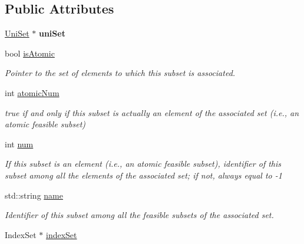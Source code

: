 \subsection*{Public Attributes}
\begin{DoxyCompactItemize}
\item 
\hypertarget{classUniSubset_a8e80f41fd95fe897ff04c813395c85d4}{\hyperlink{classUniSet}{Uni\-Set} $\ast$ {\bfseries uni\-Set}}\label{classUniSubset_a8e80f41fd95fe897ff04c813395c85d4}

\item 
\hypertarget{classUniSubset_a33f088ffb21e664508cfbfb75341513a}{bool \hyperlink{classUniSubset_a33f088ffb21e664508cfbfb75341513a}{is\-Atomic}}\label{classUniSubset_a33f088ffb21e664508cfbfb75341513a}

\begin{DoxyCompactList}\small\item\em Pointer to the set of elements to which this subset is associated. \end{DoxyCompactList}\item 
\hypertarget{classUniSubset_af111f69a265de0069e5705ce2c222f45}{int \hyperlink{classUniSubset_af111f69a265de0069e5705ce2c222f45}{atomic\-Num}}\label{classUniSubset_af111f69a265de0069e5705ce2c222f45}

\begin{DoxyCompactList}\small\item\em {\ttfamily true} if and only if this subset is actually an element of the associated set (i.\-e., an atomic feasible subset) \end{DoxyCompactList}\item 
\hypertarget{classUniSubset_a0b5a528a9edcc11061baff6ca4ce2657}{int \hyperlink{classUniSubset_a0b5a528a9edcc11061baff6ca4ce2657}{num}}\label{classUniSubset_a0b5a528a9edcc11061baff6ca4ce2657}

\begin{DoxyCompactList}\small\item\em If this subset is an element (i.\-e., an atomic feasible subset), identifier of this subset among all the elements of the associated set; if not, always equal to {\ttfamily -\/1} \end{DoxyCompactList}\item 
\hypertarget{classUniSubset_accf967a0475f78b1998fa3aaa2a6ae8e}{std\-::string \hyperlink{classUniSubset_accf967a0475f78b1998fa3aaa2a6ae8e}{name}}\label{classUniSubset_accf967a0475f78b1998fa3aaa2a6ae8e}

\begin{DoxyCompactList}\small\item\em Identifier of this subset among all the feasible subsets of the associated set. \end{DoxyCompactList}\item 
\hypertarget{classUniSubset_a32f7ed1b58639b5184c7c0321b08e6a1}{Index\-Set $\ast$ \hyperlink{classUniSubset_a32f7ed1b58639b5184c7c0321b08e6a1}{index\-Set}}\label{classUniSubset_a32f7ed1b58639b5184c7c0321b08e6a1}


\end{DoxyCompactItemize}
